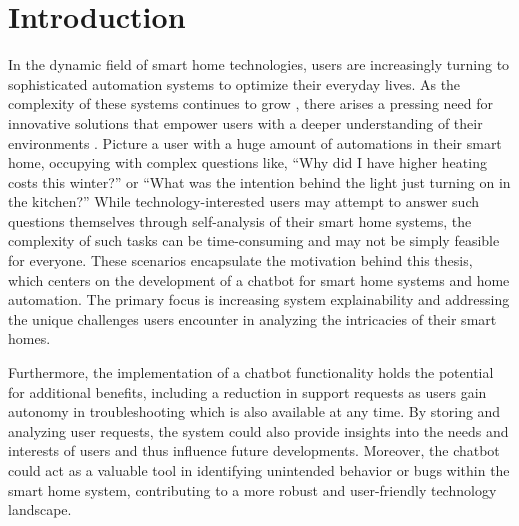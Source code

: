 \chapter{Introduction}

In the dynamic field of smart home technologies, users are increasingly turning to sophisticated automation systems to optimize their everyday lives.
As the complexity of these systems continues to grow \cite{technologies11010009}, there arises a pressing need for innovative solutions that empower users with a deeper understanding of their environments \cite{baby_home_2017}. 
Picture a user with a huge amount of automations in their smart home, occupying with complex questions like, ``Why did I have higher heating costs this winter?'' or ``What was the intention behind the light just turning on in the kitchen?''
While technology-interested users may attempt to answer such questions themselves through self-analysis of their smart home systems, the complexity of such tasks can be time-consuming and may not be simply feasible for everyone.
These scenarios encapsulate the motivation behind this thesis, which centers on the development of a chatbot for smart home systems and home automation.
The primary focus is increasing system explainability and addressing the unique challenges users encounter in analyzing the intricacies of their smart homes.

Furthermore, the implementation of a chatbot functionality holds the potential for additional benefits, including a reduction in support requests as users gain autonomy in troubleshooting \cite{HUANG2024103600} which is also available at any time. 
By storing and analyzing user requests, the system could also provide insights into the needs and interests of users and thus influence future developments. 
Moreover, the chatbot could act as a valuable tool in identifying unintended behavior or bugs within the smart home system, contributing to a more robust and user-friendly technology landscape.

